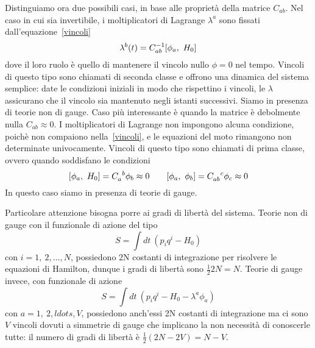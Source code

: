     Distinguiamo ora due possibili casi, in base alle proprietà della matrice $C_{ab}$. 
    Nel caso in cui sia invertibile, i moltiplicatori di Lagrange $\lambda^a$ sono fissati dall'equazione~\eqref{vincoli}
    \begin{equation}
        \lambda^b (t) = C^{-1}_{ab} [\phi_a, ~H_0]
    \end{equation}
    dove il loro ruolo è quello di mantenere il vincolo nullo $\phi = 0$ nel tempo. Vincoli di questo tipo sono chiamati di seconda classe e offrono una dinamica del sistema semplice: date le condizioni iniziali in modo che rispettino i vincoli, le $\lambda$ assicurano che il vincolo sia mantenuto negli istanti successivi. Siamo in presenza di teorie non di gauge.
    Caso più interessante è quando la matrice è debolmente nulla $C_{ab} \approx 0$. I moltiplicatori di Lagrange non impongono alcuna condizione, poichè non compaiono nella~\eqref{vincoli}, e le equazioni del moto rimangono non determinate univocamente. Vincoli di questo tipo sono chiamati di prima classe, ovvero quando soddisfano le condizioni
    \begin{equation} \label{secondaclasse}
        \poi{\phi_a}{H_0} = C_a^{\phantom a b} \phi_b \approx 0 \qquad \poi{\phi_a}{\phi_b} = C_{ab}^{\phantom{ab} c} \phi_c \approx 0
    \end{equation}
    In questo caso siamo in presenza di teorie di gauge.
    
    \hfill 

    Particolare attenzione bisogna porre ai gradi di libertà del sistema. Teorie non di gauge con il funzionale di azione del tipo 
    \begin{equation*}
        S = \int dt ~ (p_i q^i - H_0)
    \end{equation*}
    con $i=1,~2, \ldots, N$, possiedono 2N costanti di integrazione per risolvere le equazioni di Hamilton, dunque i gradi di libertà sono $\frac{1}{2} 2N = N$. Teorie di gauge invece, con funzionale di azione
    \begin{equation*}
        S = \int dt ~(p_i q^i - H_0 - \lambda^a \phi_a)
    \end{equation*}
    con $a=1,~2, ldots, V$, possiedono anch'essi 2N costanti di integrazione ma ci sono $V$ vincoli dovuti a simmetrie di gauge che implicano la non necessità di conoscerle tutte: il numero di gradi di libertà è $\frac{1}{2} (2N - 2V) = N - V$.

